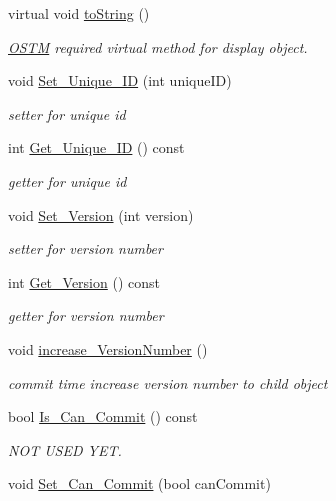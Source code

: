 \begin{DoxyCompactItemize}
virtual void \hyperlink{class_o_s_t_m_a513396a115f2987fd07c203309ae8a59}{to\+String} ()
\begin{DoxyCompactList}\small\item\em \hyperlink{class_o_s_t_m}{O\+S\+TM} required virtual method for display object. \end{DoxyCompactList}\item 
void \hyperlink{class_o_s_t_m_ab5019a32185631c08abbf826422f2d93}{Set\+\_\+\+Unique\+\_\+\+ID} (int unique\+ID)
\begin{DoxyCompactList}\small\item\em setter for unique id \end{DoxyCompactList}\item 
int \hyperlink{class_o_s_t_m_a5a01a8b98d16b1d1904ecf9356e7b71d}{Get\+\_\+\+Unique\+\_\+\+ID} () const 
\begin{DoxyCompactList}\small\item\em getter for unique id \end{DoxyCompactList}\item 
void \hyperlink{class_o_s_t_m_a9529ad8d6d28c1f0cc9b86ed91df1ae1}{Set\+\_\+\+Version} (int version)
\begin{DoxyCompactList}\small\item\em setter for version number \end{DoxyCompactList}\item 
int \hyperlink{class_o_s_t_m_a1f1db9d482f22c8e7caa17dfb340626b}{Get\+\_\+\+Version} () const 
\begin{DoxyCompactList}\small\item\em getter for version number \end{DoxyCompactList}\item 
void \hyperlink{class_o_s_t_m_a5f90caa4384d371c16b7cac860d9f89a}{increase\+\_\+\+Version\+Number} ()
\begin{DoxyCompactList}\small\item\em commit time increase version number to child object \end{DoxyCompactList}\item 
bool \hyperlink{class_o_s_t_m_a8df39ced3b401aa466df97e26d14b1b7}{Is\+\_\+\+Can\+\_\+\+Commit} () const 
\begin{DoxyCompactList}\small\item\em N\+OT U\+S\+ED Y\+ET. \end{DoxyCompactList}\item 
void \hyperlink{class_o_s_t_m_a813ee61c9d1c83c6a6ae30d12aca8a5d}{Set\+\_\+\+Can\+\_\+\+Commit} (bool can\+Commit)

\end{DoxyCompactItemize}
